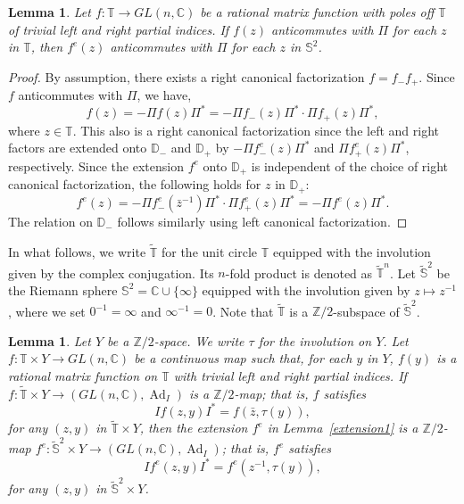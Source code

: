 \documentclass{amsart}
\theoremstyle{plain}
\newtheorem{lemma}[theorem]{Lemma}
\theoremstyle{definition}
\theoremstyle{remark}
\newcommand{\Z}{\mathbb{Z}}
\newcommand{\C}{\mathbb{C}}
\newcommand{\T}{\mathbb{T}}
\newcommand{\D}{\mathbb{D}}
\newcommand{\SSS}{\mathbb{S}}
\newcommand{\tT}{\widetilde{\T}}
\newcommand{\tS}{\widetilde{\SSS}}
\DeclareMathOperator{\Ad}{\mathrm{Ad}}
\begin{document}
\begin{lemma}
\label{extension2}
Let $f \colon \T \to GL(n,\C)$ be a rational matrix function with poles off $\T$ of trivial left and right partial indices.
If $f(z)$ anticommutes with $\Pi$ for each $z$ in $\T$, then $f^e(z)$ anticommutes with $\Pi$ for each $z$ in $\SSS^2$.
\end{lemma}
\begin{proof}
By assumption, there exists a right canonical factorization $f = f_- f_+$.
Since $f$ anticommutes with $\Pi$, we have,
\begin{equation*}
	f(z) = -\Pi f(z) \Pi^* = - \Pi f_-(z) \Pi^* \cdot \Pi f_+(z) \Pi^*,
\end{equation*}
where $z \in \T$.
This also is a right canonical factorization since the left and right factors are extended onto $\D_-$ and $\D_+$ by $-\Pi f^e_-(z)\Pi^*$ and $\Pi f^e_+(z) \Pi^*$, respectively.
Since the extension $f^e$ onto $\D_+$ is independent of the choice of right canonical factorization, the following holds for $z$ in $\D_+$:
\begin{equation*}
	f^e(z) = -\Pi f^e_-(\bar{z}^{-1})\Pi^* \cdot \Pi f^e_+(z) \Pi^* = -\Pi f^e(z) \Pi^*.
\end{equation*}
The relation on $\D_-$ follows similarly using left canonical factorization.
\end{proof}

In what follows, we write $\tT$ for the unit circle $\T$ equipped with the involution given by the complex conjugation.
Its $n$-fold product is denoted as $\tT^n$.
Let $\tS^2$ be the Riemann sphere $\SSS^2 = \C \cup \{ \infty \}$ equipped with the involution given by $z \mapsto z^{-1}$, where we set $0^{-1} = \infty$ and $\infty^{-1}=0$.
Note that $\tT$ is a $\Z/2$-subspace of $\tS^2$.

\begin{lemma}
\label{extension3}
Let $Y$ be a $\Z/2$-space. We write $\tau$ for the involution on $Y$.
Let $f \colon \T \times Y \to GL(n,\C)$ be a continuous map such that, for each $y$ in $Y$, $f(y)$ is a rational matrix function on $\T$ with trivial left and right partial indices.
If $f \colon \tT \times Y \to (GL(n,\C), \Ad_I)$ is a $\Z/2$-map; that is, $f$ satisfies
\begin{equation}
\label{lemsym}
	I f(z,y) I^* = f(\bar{z}, \tau(y)),
\end{equation}
for any $(z,y)$ in $\tT \times Y$,
then the extension $f^e$ in Lemma~\ref{extension1} is a $\Z/2$-map $f^e \colon \tS^2 \times Y \to (GL(n,\C), \Ad_I)$; that is, $f^e$
satisfies
\begin{equation*}
	I f^e(z,y) I^* = f^e(z^{-1}, \tau(y)),
\end{equation*}
for any $(z,y)$ in $\tS^2 \times Y$.
\end{lemma}
\end{document}
